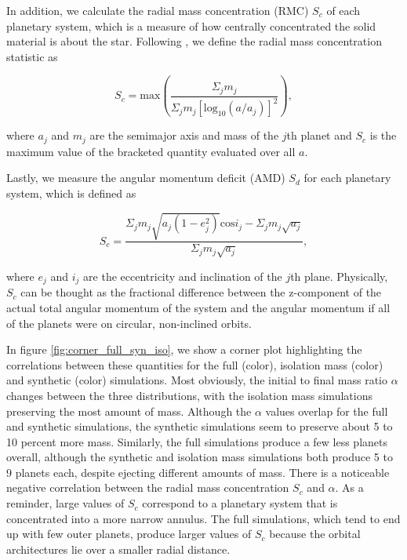 In addition, we calculate the radial mass concentration (RMC) $S_{c}$ of each planetary system, which is a measure of how centrally concentrated the solid material is about the star. Following \cite{chambers01}, we define the radial mass concentration statistic as

\begin{equation}\label{eq:rmc}
	S_{c} = \mathrm{max} \left( \frac{\Sigma_{j} m_{j}}{\Sigma_{j} m_{j} \left[ \mathrm{log}_{10} \left( a / a_{j} \right) \right]^{2}} \right),
\end{equation}

\noindent where $a_{j}$ and $m_{j}$ are the semimajor axis and mass of the $j$th planet and $S_{c}$ is the maximum value of the bracketed quantity evaluated over all $a$.

Lastly, we measure the angular momentum deficit (AMD) $S_{d}$ for each planetary system, which is defined as

\begin{equation}\label{eq:amd}
	S_{c} = \frac{\Sigma_{j} m_{j} \sqrt{a_{j} \left( 1 - e_{j}^2 \right)} \mathrm{cos} i_{j} - \Sigma_{j} m_{j} \sqrt{a_{j}}}{\Sigma_{j} m_{j} \sqrt{a_{j}}},
\end{equation}

\noindent \cite{laskar97, chambers01} where $e_{j}$ and $i_{j}$ are the eccentricity and inclination of the $j$th plane. Physically, $S_{c}$ can be thought as the fractional difference between the z-component of the actual total angular momentum of the system and the angular momentum if all of the planets were on circular, non-inclined orbits.

In figure \ref{fig:corner_full_syn_iso}, we show a corner plot highlighting the correlations between these quantities for the full (color), isolation mass (color) and synthetic (color) simulations. Most obviously, the initial to final mass ratio $\alpha$ changes between the three distributions, with the isolation mass simulations preserving the most amount of mass. Although the $\alpha$ values overlap for the full and synthetic simulations, the synthetic simulations seem to preserve about 5 to 10 percent more mass. Similarly, the full simulations produce a few less planets overall, although the synthetic and isolation mass simulations both produce 5 to 9 planets each, despite ejecting different amounts of mass. There is a noticeable negative correlation between the radial mass concentration $S_{c}$ and $\alpha$. As a reminder, large values of $S_{c}$ correspond to a planetary system that is concentrated into a more narrow annulus. The full simulations, which tend to end up with few outer planets, produce larger values of $S_{c}$ because the orbital architectures lie over a smaller radial distance.

